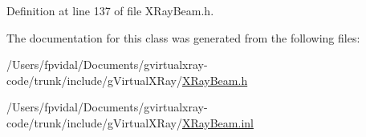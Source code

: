 Definition at line 137 of file XRayBeam.h.



The documentation for this class was generated from the following files:\begin{DoxyCompactItemize}
\item 
/Users/fpvidal/Documents/gvirtualxray-\/code/trunk/include/gVirtualXRay/\hyperlink{_x_ray_beam_8h}{XRayBeam.h}\item 
/Users/fpvidal/Documents/gvirtualxray-\/code/trunk/include/gVirtualXRay/\hyperlink{_x_ray_beam_8inl}{XRayBeam.inl}\end{DoxyCompactItemize}
